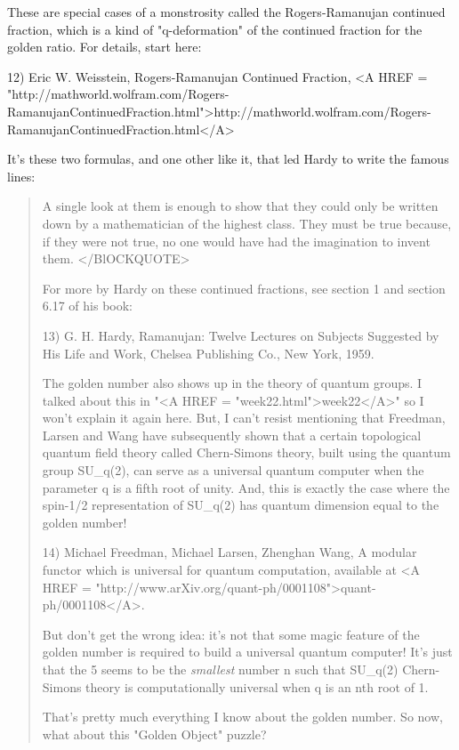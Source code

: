 $$
    
These are special cases of a monstrosity called the Rogers-Ramanujan
continued fraction, which is a kind of "q-deformation" of 
the continued fraction for the golden ratio.  For details, start here:

12) Eric W. Weisstein, Rogers-Ramanujan Continued Fraction,
<A HREF = "http://mathworld.wolfram.com/Rogers-RamanujanContinuedFraction.html">http://mathworld.wolfram.com/Rogers-RamanujanContinuedFraction.html</A> 

It's these two formulas, and one other like it, that led
Hardy to write the famous lines:

\begin{quote}
A single look at them is enough to show that they
could only be written down by a mathematician of the highest
class.  They must be true because, if they were not true,
no one would have had the imagination to invent them.  
</BlOCKQUOTE>

For more by Hardy on these continued fractions, see section 1 and
section 6.17 of his book:

13) G. H. Hardy, Ramanujan: Twelve Lectures on Subjects Suggested
by His Life and Work, Chelsea Publishing Co., New York, 1959.

The golden number also shows up in the theory of quantum groups.  
I talked about this in "<A HREF = "week22.html">week22</A>" so 
I won't explain it again here.  
But, I can't resist mentioning that Freedman, Larsen and Wang have
subsequently shown that a certain topological quantum field theory 
called Chern-Simons theory, built using the quantum group SU_{q}(2), 
can serve as a universal quantum computer when the parameter q is a 
fifth root of unity.  And, this is exactly the case where the spin-1/2 
representation of SU_{q}(2) 
has quantum dimension equal to the golden number!  

14) Michael Freedman, Michael Larsen, Zhenghan Wang, 
A modular functor which is universal for quantum computation,
available at <A HREF = "http://www.arXiv.org/quant-ph/0001108">quant-ph/0001108</A>.

But don't get the wrong idea: it's not that some magic feature of the 
golden number is required to build a universal quantum computer!  It's 
just that the 5 seems to be the \emph{smallest} 
number n such that SU_{q}(2)
Chern-Simons theory is computationally universal when q is an nth root of 1.

That's pretty much everything I know about the golden number.  So now, 
what about this "Golden Object" puzzle? 


\end{quote}
